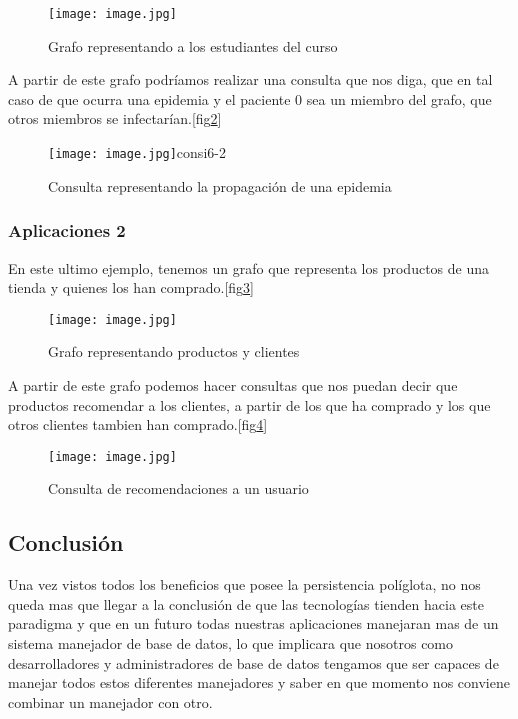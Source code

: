 \documentclass[conference,compsoc]{IEEEtran}
\begin{document}
\begin{figure}[!h]
\centering
\texttt{[image: image.jpg]}
\caption{Grafo representando a los estudiantes del curso}
\label{consi6}
\end{figure}

A partir de este grafo podríamos realizar una consulta que nos diga, que en tal caso de que ocurra una epidemia y el paciente 0 sea un miembro del grafo, que otros miembros se infectarían.[fig\ref{consi6-2}]

\begin{figure}[!h]
\centering
\texttt{[image: image.jpg]}{consi6-2}
\caption{Consulta representando la propagación de una epidemia}
\label{consi6-2}
\end{figure}

\subsubsection{Aplicaciones 2}
En este ultimo ejemplo, tenemos un grafo que representa los productos de una tienda y quienes los han comprado.[fig\ref{consi7}]

\begin{figure}[!h]
\centering
\texttt{[image: image.jpg]}
\caption{Grafo representando productos y clientes}
\label{consi7}
\end{figure}

A partir de este grafo podemos hacer consultas que nos puedan decir que productos recomendar a los clientes, a partir de los que ha comprado y los que otros clientes tambien han comprado.[fig\ref{consi7-2}]

\begin{figure}[!h]
\centering
\texttt{[image: image.jpg]}
\caption{Consulta de recomendaciones a un usuario}
\label{consi7-2}
\end{figure}

\subsection{Conclusión}

Una vez vistos todos los beneficios que posee la persistencia políglota, no nos queda mas que llegar a la conclusión de que las tecnologías tienden hacia este paradigma y que en un futuro todas nuestras aplicaciones manejaran mas de un sistema manejador de base de datos, lo que implicara que nosotros como desarrolladores y administradores de base de datos tengamos que ser capaces de manejar todos estos diferentes manejadores y saber en que momento nos conviene combinar un manejador con otro.
\end{document}
